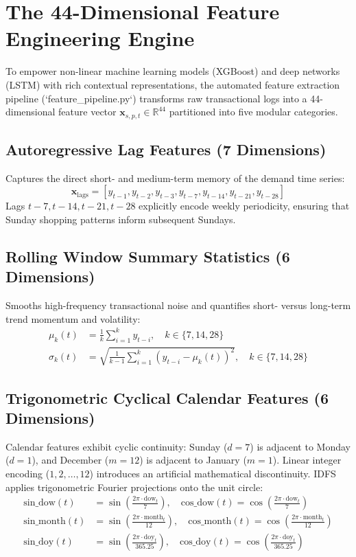 \documentclass[12pt,a4paper,oneside]{report}
\theoremstyle{definition}
\begin{document}
\section{The 44-Dimensional Feature Engineering Engine}
To empower non-linear machine learning models (XGBoost) and deep networks (LSTM) with rich contextual representations, the automated feature extraction pipeline (`feature_pipeline.py`) transforms raw transactional logs into a 44-dimensional feature vector $\mathbf{x}_{s, p, t} \in \mathbb{R}^{44}$ partitioned into five modular categories.

\subsection{Autoregressive Lag Features (7 Dimensions)}
Captures the direct short- and medium-term memory of the demand time series:
\begin{equation}
\mathbf{x}_{\text{lags}} = \left[ y_{t-1}, y_{t-2}, y_{t-3}, y_{t-7}, y_{t-14}, y_{t-21}, y_{t-28} \right]
\end{equation}
Lags $t-7, t-14, t-21, t-28$ explicitly encode weekly periodicity, ensuring that Sunday shopping patterns inform subsequent Sundays.

\subsection{Rolling Window Summary Statistics (6 Dimensions)}
Smooths high-frequency transactional noise and quantifies short- versus long-term trend momentum and volatility:
\begin{align}
\mu_{k}(t) &= \frac{1}{k}\sum_{i=1}^k y_{t-i}, \quad k \in \{7, 14, 28\} \\
\sigma_{k}(t) &= \sqrt{\frac{1}{k-1}\sum_{i=1}^k \left(y_{t-i} - \mu_{k}(t)\right)^2}, \quad k \in \{7, 14, 28\}
\end{align}

\subsection{Trigonometric Cyclical Calendar Features (6 Dimensions)}
Calendar features exhibit cyclic continuity: Sunday ($d=7$) is adjacent to Monday ($d=1$), and December ($m=12$) is adjacent to January ($m=1$). Linear integer encoding ($1, 2, \dots, 12$) introduces an artificial mathematical discontinuity. IDFS applies trigonometric Fourier projections onto the unit circle:
\begin{align}
\text{sin\_dow}(t) &= \sin\left(\frac{2\pi \cdot \text{dow}_t}{7}\right), \quad \text{cos\_dow}(t) = \cos\left(\frac{2\pi \cdot \text{dow}_t}{7}\right) \\
\text{sin\_month}(t) &= \sin\left(\frac{2\pi \cdot \text{month}_t}{12}\right), \quad \text{cos\_month}(t) = \cos\left(\frac{2\pi \cdot \text{month}_t}{12}\right) \\
\text{sin\_doy}(t) &= \sin\left(\frac{2\pi \cdot \text{doy}_t}{365.25}\right), \quad \text{cos\_doy}(t) = \cos\left(\frac{2\pi \cdot \text{doy}_t}{365.25}\right)
\end{align}
\end{document}
